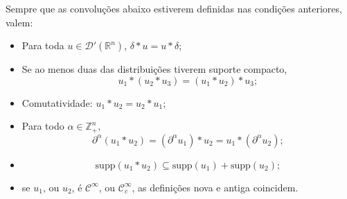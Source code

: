 \documentclass[../distribution_theory_notes.tex]{subfiles}
\begin{document}
\begin{prop*}
	Sempre que as convoluções abaixo estiverem definidas nas condições anteriores, valem:
	\begin{itemize}
		\item[(I)] Para toda \(u\in \mathcal{D}'(\mathbb{R}^{n})\), \(\delta*u=u*\delta\);
		\item[(II)] Se ao menos duas das distribuições tiverem suporte compacto,
		      \[
			      u_{1}*(u_{2}*u_{3})=(u_{1}*u_{2})*u_{3};
		      \]
		\item[(III)] Comutatividade: \(u_{1}*u_{2}=u_{2}*u_{1}\);
		\item[(IV)] Para todo \(\alpha\in \mathbb{Z}_{+}^{n}\),
		      \[
			      \partial^{\alpha}(u_{1}*u_{2})
			      =(\partial^{\alpha}u_{1})*u_{2}
			      =u_{1}*(\partial^{\alpha}u_{2});
		      \]
		\item[(V)]
		      \[
			      \mathrm{supp}(u_{1}*u_{2})
			      \subseteq \mathrm{supp}(u_{1})+\mathrm{supp}(u_{2});
		      \]
		\item[(VI)] se \(u_{1}\), ou \(u_{2}\), é \(\mathcal{C}^{\infty}\), ou \(\mathcal{C}_{c}^{\infty}\), as definições nova e antiga coincidem.
	\end{itemize}
\end{prop*}
\end{document}
